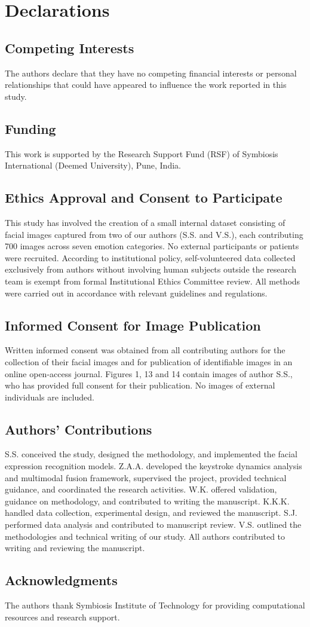 \documentclass[fleqn,10pt]{wlscirep}
\begin{document}
\section*{Declarations}

\subsection*{Competing Interests}
The authors declare that they have no competing financial interests or personal relationships that could have appeared to influence the work reported in this study.

\subsection*{Funding}
This work is supported by the Research Support Fund (RSF) of Symbiosis International (Deemed University), Pune, India.

\subsection*{Ethics Approval and Consent to Participate}
This study has involved the creation of a small internal dataset consisting of facial images captured from two of our authors (S.S. and V.S.), each contributing 700 images across seven emotion categories. No external participants or patients were recruited. According to institutional policy, self-volunteered data collected exclusively from authors without involving human subjects outside the research team is exempt from formal Institutional Ethics Committee review. All methods were carried out in accordance with relevant guidelines and regulations.

\subsection*{Informed Consent for Image Publication}
Written informed consent was obtained from all contributing authors for the collection of their facial images and for publication of identifiable images in an online open-access journal. Figures 1, 13 and 14 contain images of author S.S., who has provided full consent for their publication. No images of external individuals are included.

\subsection*{Authors' Contributions}
S.S. conceived the study, designed the methodology, and implemented the facial expression recognition models. Z.A.A. developed the keystroke dynamics analysis and multimodal fusion framework, supervised the project, provided technical guidance, and coordinated the research activities. W.K. offered validation, guidance on methodology, and contributed to writing the manuscript. K.K.K. handled data collection, experimental design, and reviewed the manuscript. S.J. performed data analysis and contributed to manuscript review. V.S. outlined the methodologies and technical writing of our study. All authors contributed to writing and reviewing the manuscript.

\subsection*{Acknowledgments}
The authors thank Symbiosis Institute of Technology for providing computational resources and research support.



\end{document}

